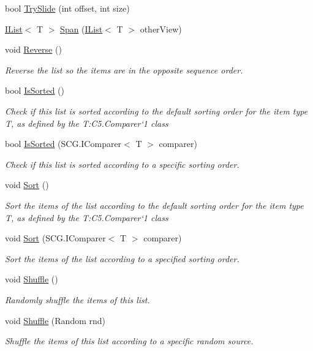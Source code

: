 \begin{DoxyCompactItemize}
bool \hyperlink{interface_c5_1_1_i_list_a04c6671051fdef61f2b199c66bbfaa21}{Try\+Slide} (int offset, int size)
\item 
\hyperlink{interface_c5_1_1_i_list}{I\+List}$<$ T $>$ \hyperlink{interface_c5_1_1_i_list_a1fb50b61d1fb0117bf1ebcd4bf06dbfa}{Span} (\hyperlink{interface_c5_1_1_i_list}{I\+List}$<$ T $>$ other\+View)
\item 
void \hyperlink{interface_c5_1_1_i_list_aea3fef718431d1ab504e15457e7fda1c}{Reverse} ()
\begin{DoxyCompactList}\small\item\em Reverse the list so the items are in the opposite sequence order. \end{DoxyCompactList}\item 
bool \hyperlink{interface_c5_1_1_i_list_aadf94b51e2c383ebda5a9f48820ef9bb}{Is\+Sorted} ()
\begin{DoxyCompactList}\small\item\em Check if this list is sorted according to the default sorting order for the item type T, as defined by the T\+:\+C5.\+Comparer`1 class \end{DoxyCompactList}\item 
bool \hyperlink{interface_c5_1_1_i_list_ad7a87f535eab2f950eb4ad3311f3385f}{Is\+Sorted} (S\+C\+G.\+I\+Comparer$<$ T $>$ comparer)
\begin{DoxyCompactList}\small\item\em Check if this list is sorted according to a specific sorting order. \end{DoxyCompactList}\item 
void \hyperlink{interface_c5_1_1_i_list_ad65ec59c8caf18dbf8cf795edf45bce5}{Sort} ()
\begin{DoxyCompactList}\small\item\em Sort the items of the list according to the default sorting order for the item type T, as defined by the T\+:\+C5.\+Comparer`1 class \end{DoxyCompactList}\item 
void \hyperlink{interface_c5_1_1_i_list_ad6708e13ea86ba9317c5f03505bba7fb}{Sort} (S\+C\+G.\+I\+Comparer$<$ T $>$ comparer)
\begin{DoxyCompactList}\small\item\em Sort the items of the list according to a specified sorting order. \end{DoxyCompactList}\item 
void \hyperlink{interface_c5_1_1_i_list_abec18a307f13a6f7e9ef9bd1f131c9e2}{Shuffle} ()
\begin{DoxyCompactList}\small\item\em Randomly shuffle the items of this list. \end{DoxyCompactList}\item 
void \hyperlink{interface_c5_1_1_i_list_afc33a89830008ad176dfd0c67ceb8b12}{Shuffle} (Random rnd)
\begin{DoxyCompactList}\small\item\em Shuffle the items of this list according to a specific random source. \end{DoxyCompactList}\end{DoxyCompactItemize}
